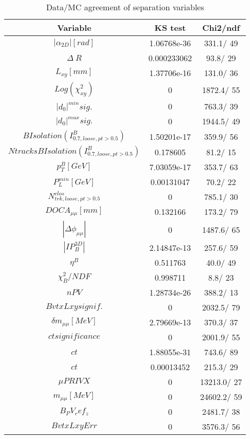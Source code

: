 \documentclass{article}
\begin{document}
\begin{table}[htbp]
\caption{\label{tab:sepVars}Data/MC agreement of separation variables}
\begin{center}
\begin{tabular}{c|c|c}
Variable & KS test & Chi2/ndf \\
\hline
$|\alpha_{2D}| [rad]$ & 1.06768e-36 & 331.1/ 49\\
\hline
$\Delta~R$ & 0.000233062 &  93.8/ 29\\
\hline
$L_{xy} [mm]$ & 1.37706e-16 & 131.0/ 36\\
\hline
$Log(\chi^{2}_{xy})$ & 0 & 1872.4/ 55\\
\hline
$|d_{0}|^{min} sig.$ & 0 & 763.3/ 39\\
\hline
$|d_{0}|^{max} sig.$ & 0 & 1944.5/ 49\\
\hline
$B Isolation (I^{B}_{0.7, loose, pt>0.5})$ & 1.50201e-17 & 359.9/ 56\\
\hline
$Ntracks B Isolation (I^{B}_{0.7, loose, pt>0.5})$ & 0.178605 &  81.2/ 15\\
\hline
$p_{T}^{B} [GeV]$ & 7.03059e-17 & 353.7/ 63\\
\hline
$P^{min}_{L} [GeV]$ & 0.00131047 &  70.2/ 22\\
\hline
$N^{clos}_{trk, loose, pt>0.5}$ & 0 & 785.1/ 30\\
\hline
$DOCA_{\mu\mu} [mm]$ & 0.132166 & 173.2/ 79\\
\hline
$|\Delta\phi_{\mu\mu}|$ & 0 & 1487.6/ 65\\
\hline
$|IP_{B}^{3D}|$ & 2.14847e-13 & 257.6/ 59\\
\hline
$\eta^{B}$ & 0.511763 &  40.0/ 49\\
\hline
$\chi^{2}_{B}/NDF$ & 0.998711 &   8.8/ 23\\
\hline
$nPV$ & 1.28734e-26 & 388.2/ 13\\
\hline
$BvtxLxy signif.$ & 0 & 2032.5/ 79\\
\hline
$\delta m_{\mu\mu} [MeV]$ & 2.79669e-13 & 370.3/ 37\\
\hline
$ct significance$ & 0 & 2001.9/ 55\\
\hline
$ct$ & 1.88055e-31 & 743.6/ 89\\
\hline
$ct$ & 0.00013452 & 215.3/ 29\\
\hline
$\mu PRIVX$ & 0 & 13213.0/ 27\\
\hline
$m_{\mu\mu} [MeV]$ & 0 & 24602.2/ 59\\
\hline
$B_PV_ref_z$ & 0 & 2481.7/ 38\\
\hline
$BvtxLxyErr$ & 0 & 3576.3/ 56\\

\end{tabular}
\end{center}
\end{table}
\end{document}
